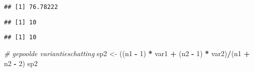 \documentclass[12pt,dutch,coursenotes]{book}
\newenvironment{Shaded}{\begin{snugshade}}{\end{snugshade}}
\newcommand{\KeywordTok}[1]{\textcolor[rgb]{0.13,0.29,0.53}{\textbf{#1}}}
\newcommand{\DecValTok}[1]{\textcolor[rgb]{0.00,0.00,0.81}{#1}}
\newcommand{\StringTok}[1]{\textcolor[rgb]{0.31,0.60,0.02}{#1}}
\newcommand{\CommentTok}[1]{\textcolor[rgb]{0.56,0.35,0.01}{\textit{#1}}}
\newcommand{\OperatorTok}[1]{\textcolor[rgb]{0.81,0.36,0.00}{\textbf{#1}}}
\newcommand{\NormalTok}[1]{#1}
\theoremstyle{definition}
\theoremstyle{definition}
\theoremstyle{definition}
\theoremstyle{remark}
\begin{document}
\begin{Shaded}
\end{Shaded}

\begin{verbatim}
## [1] 76.78222
\end{verbatim}

\begin{Shaded}
\end{Shaded}

\begin{verbatim}
## [1] 10
\end{verbatim}

\begin{Shaded}
\end{Shaded}

\begin{verbatim}
## [1] 10
\end{verbatim}

\begin{Shaded}
\begin{Highlighting}[]
\CommentTok{# gepoolde variantieschatting}
\NormalTok{sp2 <-}\StringTok{ }\NormalTok{((n1 }\OperatorTok{-}\StringTok{ }\DecValTok{1}\NormalTok{) }\OperatorTok{*}\StringTok{ }\NormalTok{var1 }\OperatorTok{+}\StringTok{ }\NormalTok{(n2 }\OperatorTok{-}\StringTok{ }\DecValTok{1}\NormalTok{) }\OperatorTok{*}\StringTok{ }\NormalTok{var2)}\OperatorTok{/}\NormalTok{(n1 }\OperatorTok{+}\StringTok{ }\NormalTok{n2 }\OperatorTok{-}\StringTok{ }
\StringTok{    }\DecValTok{2}\NormalTok{)}
\NormalTok{sp2}
\end{Highlighting}
\end{Shaded}
\end{document}
